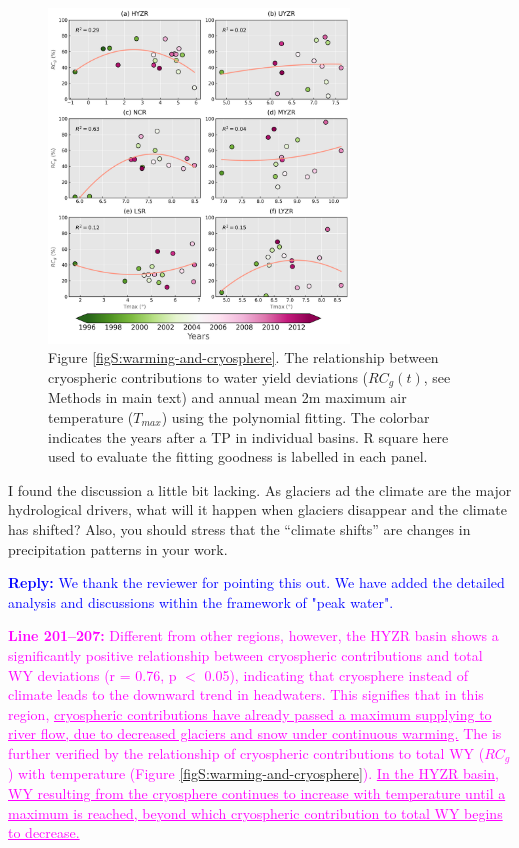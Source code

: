 \documentclass[11pt]{article}
\newcounter{reviewer}
\newcounter{point}[reviewer]
\renewcommand{\thepoint}{Comment\,\thereviewer.\arabic{point}:}
\newcommand{\point}[1]{\refstepcounter{point} \bigskip \noindent {\fontseries{b}\selectfont \thepoint} #1 \par}
\newcommand{\reply}[1]{\bigskip \textcolor{blue}{\noindent \textbf {Reply:} #1}}
\newcommand{\revised}[3][2]{\bigskip \textcolor{magenta}{\noindent \textbf{Line #2:} #3}}
\begin{document}
\begin{figure}[ht]
    \centering
    \includegraphics[width=8cm]{02-figures/peak-water-analysis.png}
    \captionsetup{labelformat=empty}
    \caption{Figure \ref{figS:warming-and-cryosphere}. The relationship between cryospheric contributions to water yield deviations ($RC_g(t)$, see Methods in main text) and annual mean 2m maximum air temperature ($T_{max}$) using the polynomial fitting. 
    The colorbar indicates the years after a TP in individual basins. 
    R square here used to evaluate the fitting goodness is labelled in each panel.}
\end{figure}

\point{I found the discussion a little bit lacking. As glaciers ad the climate are the major hydrological drivers, what will it happen when glaciers disappear and the climate has shifted? Also, you should stress that the “climate shifts” are changes in precipitation patterns in your work.}
\reply{We thank the reviewer for pointing this out. We have added the detailed analysis and discussions within the framework of "peak water".}

\revised{201--207}{Different from other regions, however, the HYZR basin shows a significantly positive relationship between cryospheric contributions and total WY deviations (r = 0.76, p $<$ 0.05), indicating that cryosphere instead of climate leads to the downward trend in headwaters.
This signifies that in this region, \ul{cryospheric contributions have already passed a maximum supplying to river flow, due to decreased glaciers and snow under continuous warming.} 
The is further verified by the relationship of cryospheric contributions to total WY ($RC_g$) with temperature (Figure \ref{figS:warming-and-cryosphere}). 
\ul{In the HYZR basin, WY resulting from the cryosphere continues to increase with temperature until a maximum is reached, beyond which cryospheric contribution to total WY begins to decrease.}}
\end{document}
